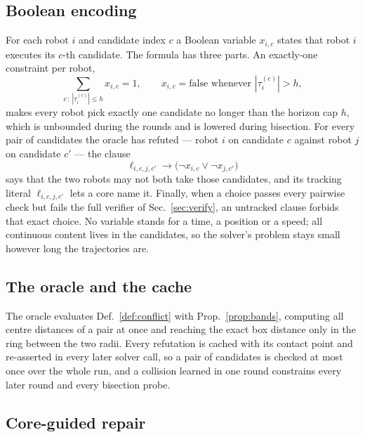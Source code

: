 \documentclass[conference]{IEEEtran}
\theoremstyle{plain}
\theoremstyle{definition}
\begin{document}
\subsection{Boolean encoding}
\label{sec:encoding}

For each robot $i$ and candidate index $c$ a Boolean variable $x_{i,c}$ states that robot $i$
executes its $c$-th candidate. The formula has three parts. An exactly-one constraint per
robot,
\begin{equation}
  \textstyle\sum_{c\,:\,|\tau_i^{(c)}| \le h} x_{i,c} = 1,
  \qquad x_{i,c} = \text{false whenever } |\tau_i^{(c)}| > h,
  \label{eq:exactlyone}
\end{equation}
makes every robot pick exactly one candidate no longer than the horizon cap $h$, which is
unbounded during the rounds and is lowered during bisection. For every pair of candidates the
oracle has refuted --- robot $i$ on candidate $c$ against robot $j$ on candidate $c'$ --- the
clause
\begin{equation}
  \ell_{i,c,j,c'} \rightarrow \big(\neg x_{i,c} \vee \neg x_{j,c'}\big)
  \label{eq:clause}
\end{equation}
says that the two robots may not both take those candidates, and its tracking literal
$\ell_{i,c,j,c'}$ lets a core name it. Finally, when a choice passes every pairwise check but
fails the full verifier of Sec.~\ref{sec:verify}, an untracked clause forbids that exact
choice. No variable stands for a time, a position or a speed; all continuous content lives in
the candidates, so the solver's problem stays small however long the trajectories are.

\subsection{The oracle and the cache}
\label{sec:oracle}

The oracle evaluates Def.~\ref{def:conflict} with Prop.~\ref{prop:bands}, computing all centre
distances of a pair at once and reaching the exact box distance only in the ring between the
two radii. Every refutation is cached with its contact point and re-asserted in every later
solver call, so a pair of candidates is checked at most once over the whole run, and a
collision learned in one round constrains every later round and every bisection probe.

\subsection{Core-guided repair}
\label{sec:repair}
\end{document}

